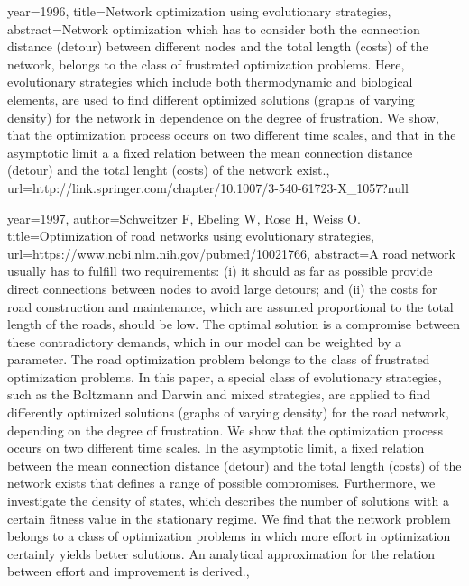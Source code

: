 
year={1996},
title={Network optimization using evolutionary strategies},
abstract={Network optimization which has to consider both the connection distance (detour) between different nodes and the total length (costs) of the network, belongs to the class of frustrated optimization problems. Here, evolutionary strategies which include both thermodynamic and biological elements, are used to find different optimized solutions (graphs of varying density) for the network in dependence on the degree of frustration. We show, that the optimization process occurs on two different time scales, and that in the asymptotic limit a a fixed relation between the mean connection distance (detour) and the total lenght (costs) of the network exist.},
url={http://link.springer.com/chapter/10.1007/3-540-61723-X_1057?null}

year={1997},
author={Schweitzer F, Ebeling W, Rose H, Weiss O.}
title={Optimization of road networks using evolutionary strategies},
url={https://www.ncbi.nlm.nih.gov/pubmed/10021766},
abstract={A road network usually has to fulfill two requirements: (i) it should as far as possible provide direct connections between nodes to avoid large detours; and (ii) the costs for road construction and maintenance, which are assumed proportional to the total length of the roads, should be low. The optimal solution is a compromise between these contradictory demands, which in our model can be weighted by a parameter. The road optimization problem belongs to the class of frustrated optimization problems. In this paper, a special class of evolutionary strategies, such as the Boltzmann and Darwin and mixed strategies, are applied to find differently optimized solutions (graphs of varying density) for the road network, depending on the degree of frustration. We show that the optimization process occurs on two different time scales. In the asymptotic limit, a fixed relation between the mean connection distance (detour) and the total length (costs) of the network exists that defines a range of possible compromises. Furthermore, we investigate the density of states, which describes the number of solutions with a certain fitness value in the stationary regime. We find that the network problem belongs to a class of optimization problems in which more effort in optimization certainly yields better solutions. An analytical approximation for the relation between effort and improvement is derived.},